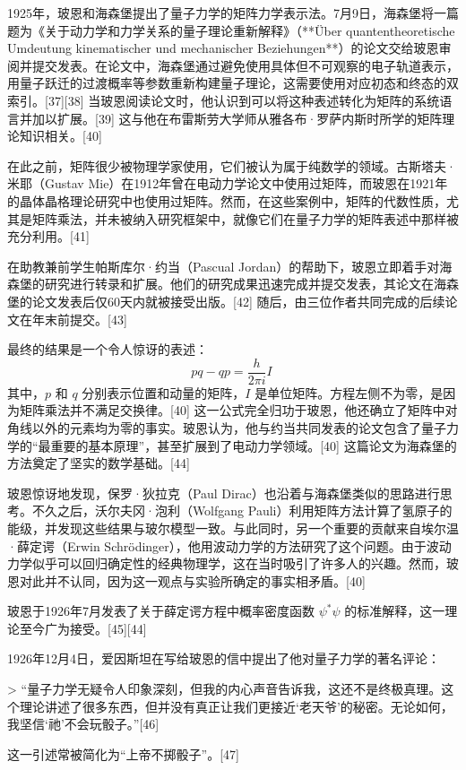1925年，玻恩和海森堡提出了量子力学的矩阵力学表示法。7月9日，海森堡将一篇题为《关于动力学和力学关系的量子理论重新解释》（**Über quantentheoretische Umdeutung kinematischer und mechanischer Beziehungen**）的论文交给玻恩审阅并提交发表。在论文中，海森堡通过避免使用具体但不可观察的电子轨道表示，用量子跃迁的过渡概率等参数重新构建量子理论，这需要使用对应初态和终态的双索引。[37][38] 当玻恩阅读论文时，他认识到可以将这种表述转化为矩阵的系统语言并加以扩展。[39] 这与他在布雷斯劳大学师从雅各布·罗萨内斯时所学的矩阵理论知识相关。[40]

在此之前，矩阵很少被物理学家使用，它们被认为属于纯数学的领域。古斯塔夫·米耶（Gustav Mie）在1912年曾在电动力学论文中使用过矩阵，而玻恩在1921年的晶体晶格理论研究中也使用过矩阵。然而，在这些案例中，矩阵的代数性质，尤其是矩阵乘法，并未被纳入研究框架中，就像它们在量子力学的矩阵表述中那样被充分利用。[41] 

在助教兼前学生帕斯库尔·约当（Pascual Jordan）的帮助下，玻恩立即着手对海森堡的研究进行转录和扩展。他们的研究成果迅速完成并提交发表，其论文在海森堡的论文发表后仅60天内就被接受出版。[42] 随后，由三位作者共同完成的后续论文在年末前提交。[43] 

最终的结果是一个令人惊讶的表述：
\[
pq - qp = \frac{h}{2\pi i}I~
\]
其中，\(p\) 和 \(q\) 分别表示位置和动量的矩阵，\(I\) 是单位矩阵。方程左侧不为零，是因为矩阵乘法并不满足交换律。[40] 这一公式完全归功于玻恩，他还确立了矩阵中对角线以外的元素均为零的事实。玻恩认为，他与约当共同发表的论文包含了量子力学的“最重要的基本原理”，甚至扩展到了电动力学领域。[40] 这篇论文为海森堡的方法奠定了坚实的数学基础。[44]

玻恩惊讶地发现，保罗·狄拉克（Paul Dirac）也沿着与海森堡类似的思路进行思考。不久之后，沃尔夫冈·泡利（Wolfgang Pauli）利用矩阵方法计算了氢原子的能级，并发现这些结果与玻尔模型一致。与此同时，另一个重要的贡献来自埃尔温·薛定谔（Erwin Schrödinger），他用波动力学的方法研究了这个问题。由于波动力学似乎可以回归确定性的经典物理学，这在当时吸引了许多人的兴趣。然而，玻恩对此并不认同，因为这一观点与实验所确定的事实相矛盾。[40] 

玻恩于1926年7月发表了关于薛定谔方程中概率密度函数 \( \psi^*\psi \) 的标准解释，这一理论至今广为接受。[45][44]

1926年12月4日，爱因斯坦在写给玻恩的信中提出了他对量子力学的著名评论：

> “量子力学无疑令人印象深刻，但我的内心声音告诉我，这还不是终极真理。这个理论讲述了很多东西，但并没有真正让我们更接近‘老天爷’的秘密。无论如何，我坚信‘祂’不会玩骰子。”[46]

这一引述常被简化为“上帝不掷骰子”。[47]

